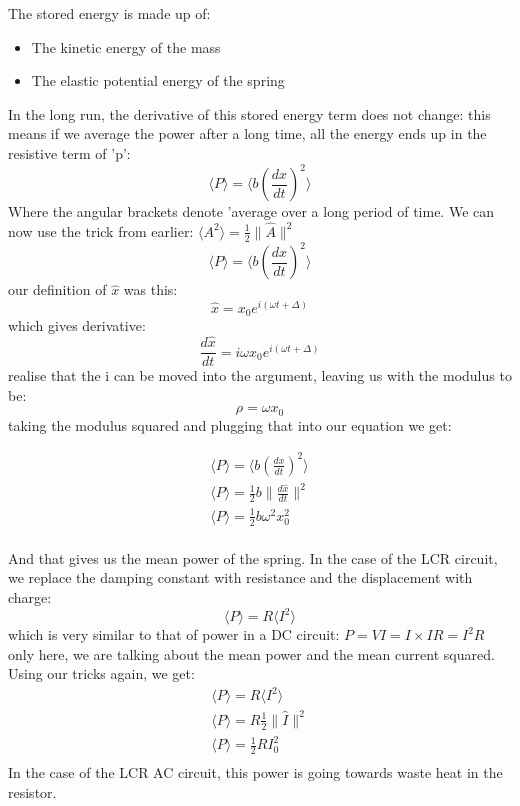 \documentclass[10pt]{report}
\begin{document}
{{{The stored energy is made up of:
\begin{itemize}
	\item{The kinetic energy of the mass}
	\item{The elastic potential energy of the spring}
\end{itemize}
In the long run, the derivative of this stored energy term does not change: this means if we average the power after a long time, all the energy ends up in the resistive term of 'p': \[
\langle P\rangle=\langle b\left(\frac{dx}{dt}\right)^{2}\rangle
\] Where the angular brackets denote 'average over a long period of time. We can now use the trick from earlier: $\langle A^{2}\rangle=\frac{1}{2}\|\hat{A}\|^{2}$ \[
\langle P\rangle=\langle b\left(\frac{dx}{dt}\right)^{2}\rangle
\] our definition of $\hat{x}$ was this: 
\[
\hat{x}=x_{0}e^{i\left(\omega t+\Delta\right)} 
\] which gives derivative: 
\[
\frac{d\hat{x}}{dt}=i\omega x_{0}e^{i\left(\omega t+\Delta\right)}
\] realise that the i can be moved into the argument, leaving us with the modulus to be: \[
\rho=\omega x_{0}
\] taking the modulus squared and plugging that into our equation we get: }
\begin{align*}
\langle P\rangle=\langle b\left(\frac{dx}{dt}\right)^{2}\rangle \\
\langle P\rangle=\frac{1}{2}b\|\frac{d\hat{x}}{dt}\|^{2} \\
\langle P\rangle=\frac{1}{2}b\omega^{2}x_{0}^{2} \\
\end{align*}
\par{And that gives us the mean power of the spring. In the case of the LCR circuit, we replace the damping constant with resistance and the displacement with charge: \[
\langle P\rangle=R\langle I^{2}\rangle
\] which is very similar to that of power in a DC circuit: $P=VI=I\times IR=I^{2}R$ only here, we are talking about the mean power and the mean current squared. Using our tricks again, we get: }
\begin{align*}
\langle P\rangle=R\langle I^{2}\rangle \\
\langle P\rangle=R\frac{1}{2}\|\hat{I}\|^{2} \\
\langle P\rangle=\frac{1}{2}RI_{0}^{2} \\
\end{align*}
In the case of the LCR AC circuit, this power is going towards waste heat in the resistor.

}}
\end{document}

